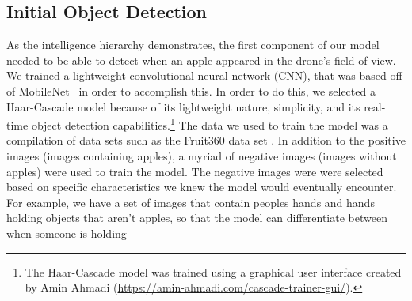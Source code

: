 \subsection{Initial Object Detection}
As the intelligence hierarchy demonstrates, the first component of our model needed to be able to detect when an apple appeared in the drone's field of view. 
We trained a lightweight convolutional neural network (CNN), that was based off of MobileNet~\cite{Sandler2018,PyTorchMobileNet} in order to accomplish this. 
In order to do this, we selected a Haar-Cascade model because of its lightweight nature, simplicity, and its real-time object detection capabilities.\footnote{The Haar-Cascade model was trained using a graphical user interface created by Amin Ahmadi (\url{https://amin-ahmadi.com/cascade-trainer-gui/}).} 
The data we used to train the model was a compilation of data sets such as the Fruit360 data set \cite{Fruit360}.
In addition to the positive images (images containing apples), a myriad of negative images (images without apples) were used to train the model.
The negative images were were selected based on specific characteristics we knew the model would eventually encounter. 
For example, we have a set of images that contain peoples hands and hands holding objects that aren't apples, so that the model can differentiate between when someone is holding